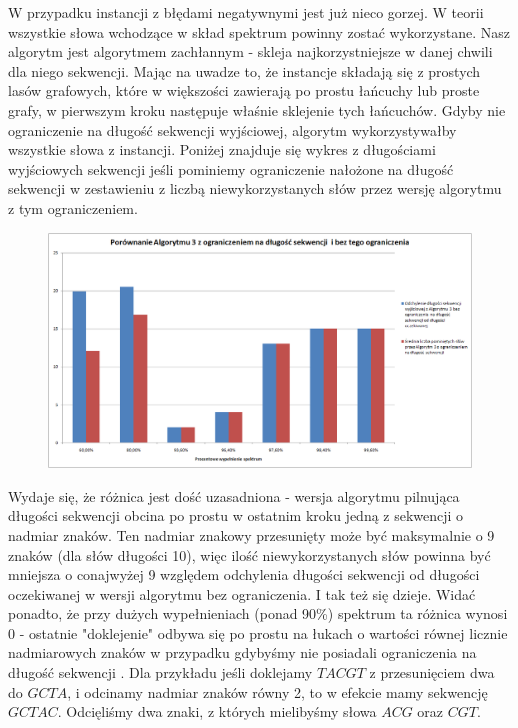 \documentclass[a4paper,10pt]{article}
\begin{document}
W przypadku instancji z błędami negatywnymi jest już nieco gorzej. W teorii wszystkie słowa wchodzące w skład spektrum powinny zostać wykorzystane. Nasz algorytm jest algorytmem zachłannym - skleja najkorzystniejsze w danej chwili dla niego sekwencji. Mając na uwadze to, że instancje składają się z prostych lasów grafowych, które w większości zawierają po prostu łańcuchy lub proste grafy, w pierwszym kroku następuje właśnie sklejenie tych łańcuchów. Gdyby nie ograniczenie na długość sekwencji wyjściowej, algorytm wykorzystywałby wszystkie słowa z instancji. Poniżej znajduje się wykres z długościami wyjściowych sekwencji jeśli pominiemy ograniczenie nałożone na długość sekwencji w zestawieniu z liczbą niewykorzystanych słów przez wersję algorytmu z tym ograniczeniem.

\begin{figure}[h]
  \footnotesize\centering
  \includegraphics[width=\textwidth,keepaspectratio]{withoutNConstraint_general_negative.png}
\end{figure}

Wydaje się, że różnica jest dość uzasadniona - wersja algorytmu pilnująca długości sekwencji obcina po prostu w ostatnim kroku jedną z sekwencji o nadmiar znaków. Ten nadmiar znakowy przesunięty może być maksymalnie o 9 znaków (dla słów długości 10), więc ilość niewykorzystanych słów powinna być mniejsza o conajwyżej 9 względem odchylenia długości sekwencji od długości oczekiwanej w wersji algorytmu bez ograniczenia. I tak też się dzieje. Widać ponadto, że przy dużych wypełnieniach (ponad 90\%) spektrum ta różnica wynosi 0 - ostatnie "doklejenie" odbywa się po prostu na łukach o wartości równej licznie nadmiarowych znaków w przypadku gdybyśmy nie posiadali ograniczenia na długość sekwencji . Dla przykładu jeśli doklejamy $TACGT$ z przesunięciem dwa do $GCTA$, i odcinamy nadmiar znaków równy 2, to w efekcie mamy sekwencję $GCTAC$. Odcięliśmy dwa znaki, z których mielibyśmy słowa $ACG$ oraz $CGT$.
\end{document}
